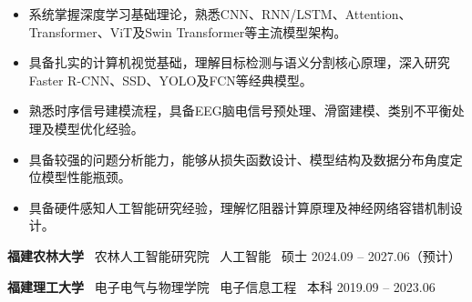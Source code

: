 \documentclass[zh]{resume}
\newcommand{\EduItem}[5]{%
  \noindent\textbf{#1} \textbullet\ #2 \textbullet\ #3 \textbullet\ #4
  \hfill #5\par
}
\begin{document}
\makeheader

\begin{abstract}
福建农林大学人工智能专业硕士研究生在读，预计2027年6月毕业。研究方向涵盖深度学习、计算机视觉、时序信号分析及硬件感知人工智能。系统学习并实践了CNN、LSTM、Transformer、Vision Transformer及Swin Transformer等主流深度学习架构，具备从网络结构设计、张量流动分析到模型训练优化的完整理解能力。

科研方面，以第一作者开展基于忆阻器的仿生自修复神经网络研究，针对永久故障场景提出基于Gradient Mask的容错训练机制，在30\%器件故障率下恢复90\%以上模型性能；同时负责基于忆阻器的CHB-MIT数据集的癫痫发作预测研究，实现95.6\%的F1 Score。具备独立完成数据处理、模型设计、实验分析及论文撰写的能力。
\end{abstract}

\begin{itemize}
    \item 系统掌握深度学习基础理论，熟悉CNN、RNN/LSTM、Attention、Transformer、ViT及Swin Transformer等主流模型架构。
    \item 具备扎实的计算机视觉基础，理解目标检测与语义分割核心原理，深入研究Faster R-CNN、SSD、YOLO及FCN等经典模型。
    \item 熟悉时序信号建模流程，具备EEG脑电信号预处理、滑窗建模、类别不平衡处理及模型优化经验。
    \item 具备较强的问题分析能力，能够从损失函数设计、模型结构及数据分布角度定位模型性能瓶颈。
    \item 具备硬件感知人工智能研究经验，理解忆阻器计算原理及神经网络容错机制设计。
\end{itemize}

\begingroup
\small
\EduItem{福建农林大学}{农林人工智能研究院}{人工智能}{硕士}{2024.09 -- 2027.06（预计）}
\EduItem{福建理工大学}{电子电气与物理学院}{电子信息工程}{本科}{2019.09 -- 2023.06}
\endgroup
\end{document}
